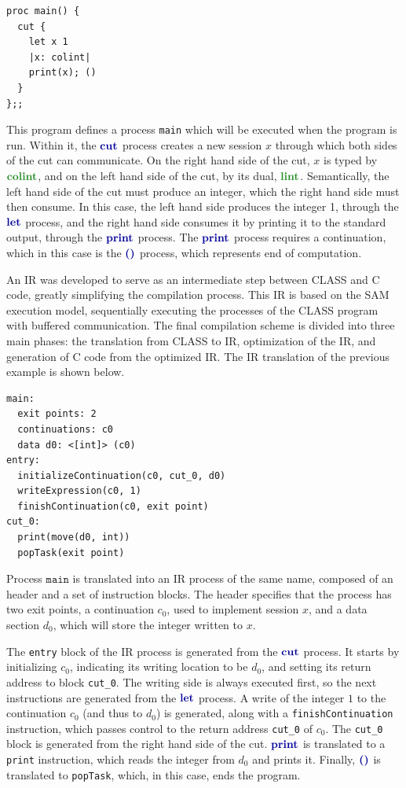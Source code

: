 \documentclass[sigconf,nonacm,natbib=true]{acmart}
\begin{document}
\begin{lstlisting}[language=CLASS]
proc main() {
  cut {
    let x 1
    |x: colint|
    print(x); ()
  }
};;
\end{lstlisting}

This program defines a process \texttt{main} which will be executed when the program is run. Within it, the $\cutp$ process creates a new session $x$ through which both sides of the cut can communicate. On the right hand side of the cut, $x$ is typed by $\colintt$, and on the left hand side of the cut, by its dual, $\lintt$. Semantically, the left hand side of the cut must produce an integer, which the right hand side must then consume. In this case, the left hand side produces the integer 1, through the $\letp$ process, and the right hand side consumes it by printing it to the standard output, through the $\printp$ process. The $\printp$ process requires a continuation, which in this case is the $\emptyp$ process, which represents end of computation.

An \acf{IR} was developed to serve as an intermediate step between \ac{CLASS} and C code, greatly simplifying the compilation process. This \ac{IR} is based on the \ac{SAM} execution model, sequentially executing the processes of the \ac{CLASS} program with buffered communication. The final compilation scheme is divided into three main phases: the translation from \ac{CLASS} to \ac{IR}, optimization of the \ac{IR}, and generation of C code from the optimized \ac{IR}. The \ac{IR} translation of the previous example is shown below.
\begin{lstlisting}[language=IR]
main:
  exit points: 2
  continuations: c0
  data d0: <[int]> (c0)
entry:
  initializeContinuation(c0, cut_0, d0)
  writeExpression(c0, 1)
  finishContinuation(c0, exit point)
cut_0:
  print(move(d0, int))
  popTask(exit point)
\end{lstlisting}
Process $\texttt{main}$ is translated into an \ac{IR} process of the same name, composed of an header and a set of instruction blocks. The header specifies that the process has two exit points, a continuation $c_0$, used to implement session $x$, and a data section $d_0$, which will store the integer written to $x$.

The \texttt{entry} block of the \ac{IR} process is generated from the $\cutp$ process. It starts by initializing $c_0$, indicating its writing location to be $d_0$, and setting its return address to block \texttt{cut\_0}. The writing side is always executed first, so the next instructions are generated from the $\letp$ process. A write of the integer $1$ to the continuation $c_0$ (and thus to $d_0$) is generated, along with a \texttt{finishContinuation} instruction, which passes control to the return address \texttt{cut\_0} of $c_0$. The \texttt{cut\_0} block is generated from the right hand side of the cut. $\printp$ is translated to a \texttt{print} instruction, which reads the integer from $d_0$ and prints it. Finally, $\emptyp$ is translated to \texttt{popTask}, which, in this case, ends the program.
\end{document}
